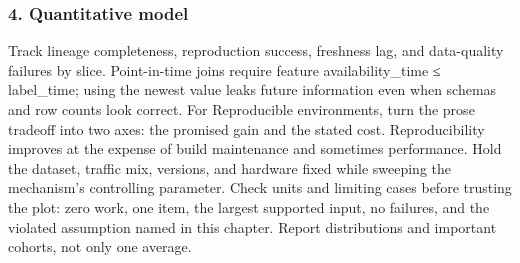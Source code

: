 \subsubsection*{4. Quantitative model}
Track lineage completeness, reproduction success, freshness lag, and data-quality failures by slice. Point-in-time joins require feature availability\_time ≤ label\_time; using the newest value leaks future information even when schemas and row counts look correct.
For Reproducible environments, turn the prose tradeoff into two axes: the promised gain and the stated cost. Reproducibility improves at the expense of build maintenance and sometimes performance. Hold the dataset, traffic mix, versions, and hardware fixed while sweeping the mechanism's controlling parameter.
Check units and limiting cases before trusting the plot: zero work, one item, the largest supported input, no failures, and the violated assumption named in this chapter. Report distributions and important cohorts, not only one average.
